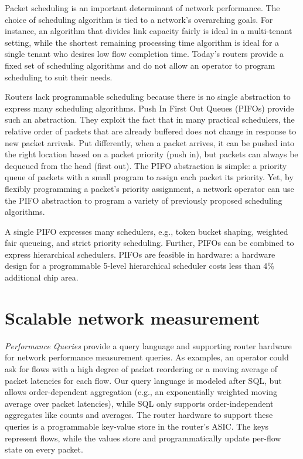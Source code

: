 Packet scheduling is an important determinant of network performance. The
choice of scheduling algorithm is tied to a network’s overarching goals. For
instance, an algorithm that divides link capacity fairly is ideal in a
multi-tenant setting, while the shortest remaining processing time algorithm is
ideal for a single tenant who desires low flow completion time. Today’s routers
provide a fixed set of scheduling algorithms and do not allow an operator to
program scheduling to suit their needs.

Routers lack programmable scheduling because there is no single abstraction to
express many scheduling algorithms. Push In First Out Queues (PIFOs) provide
such an abstraction. They exploit the fact that in many practical schedulers,
the relative order of packets that are already buffered does not change in
response to new packet arrivals. Put differently, when a packet arrives, it can
be pushed into the right location based on a packet priority (push in), but
packets can always be dequeued from the head (first out). The PIFO abstraction is simple: a priority queue of packets with a small program to assign each packet its priority. Yet, by flexibly programming a packet’s priority assignment, a network operator can use the PIFO abstraction to program a variety of previously proposed scheduling algorithms.

A single PIFO expresses many schedulers, e.g., token bucket shaping, weighted
fair queueing, and strict priority scheduling. Further, PIFOs can be combined
to express hierarchical schedulers. PIFOs are feasible in hardware: a hardware
design for a programmable 5-level hierarchical scheduler costs less than 4\%
additional chip area.

\section{Scalable network measurement}

\textit{Performance Queries} provide a query language and supporting router
hardware for network performance measurement queries. As examples, an operator
could ask for flows with a high degree of packet reordering or a moving average
of packet latencies for each flow. Our query language is modeled after SQL, but
allows order-dependent aggregation (e.g., an exponentially weighted moving
average over packet latencies), while SQL only supports order-independent
aggregates like counts and averages. The router hardware to support these
queries is a programmable key-value store in the router’s ASIC. The keys
represent flows, while the values store and programmatically update per-flow
state on every packet.
